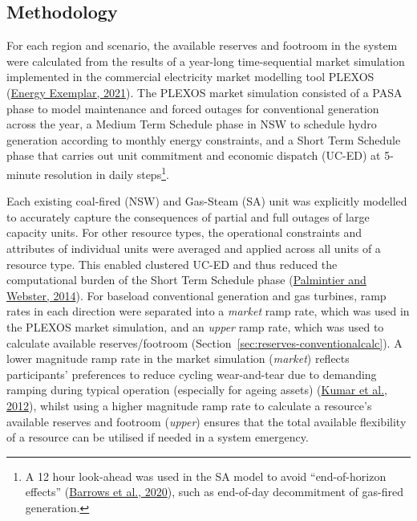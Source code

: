 \documentclass[12pt,a4paper,]{report}
\begin{document}
\hypertarget{sec:reserves-method}{%
\subsection{Methodology}\label{sec:reserves-method}}

For each region and scenario, the available reserves and footroom in the
system were calculated from the results of a year-long time-sequential
market simulation implemented in the commercial electricity market
modelling tool PLEXOS
(\protect\hyperlink{ref-energyexemplarPLEXOSEnergyMarket2021}{Energy
Exemplar, 2021}). The PLEXOS market simulation consisted of a PASA phase
to model maintenance and forced outages for conventional generation
across the year, a Medium Term Schedule phase in NSW to schedule hydro
generation according to monthly energy constraints, and a Short Term
Schedule phase that carries out unit commitment and economic dispatch
(UC-ED) at 5-minute resolution in daily steps\footnote{A 12 hour
  look-ahead was used in the SA model to avoid ``end-of-horizon
  effects''
  (\protect\hyperlink{ref-barrowsIEEEReliabilityTest2020}{Barrows et
  al., 2020}), such as end-of-day decommitment of gas-fired generation.}.

Each existing coal-fired (NSW) and Gas-Steam (SA) unit was explicitly
modelled to accurately capture the consequences of partial and full
outages of large capacity units. For other resource types, the
operational constraints and attributes of individual units were averaged
and applied across all units of a resource type. This enabled clustered
UC-ED and thus reduced the computational burden of the Short Term
Schedule phase
(\protect\hyperlink{ref-palmintierHeterogeneousUnitClustering2014}{Palmintier
and Webster, 2014}). For baseload conventional generation and gas
turbines, ramp rates in each direction were separated into a
\emph{market} ramp rate, which was used in the PLEXOS market simulation,
and an \emph{upper} ramp rate, which was used to calculate available
reserves/footroom (Section~\ref{sec:reserves-conventionalcalc}). A lower
magnitude ramp rate in the market simulation (\emph{market}) reflects
participants' preferences to reduce cycling wear-and-tear due to
demanding ramping during typical operation (especially for ageing
assets) (\protect\hyperlink{ref-kumarPowerPlantCycling2012}{Kumar et
al., 2012}), whilst using a higher magnitude ramp rate to calculate a
resource's available reserves and footroom (\emph{upper}) ensures that
the total available flexibility of a resource can be utilised if needed
in a system emergency.
\end{document}
